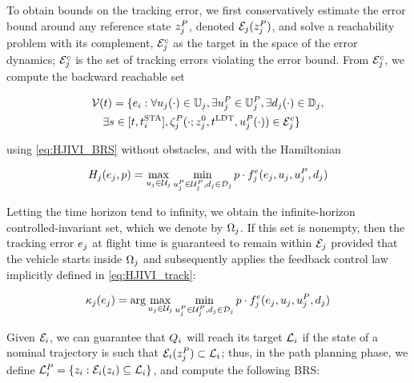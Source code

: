 To obtain bounds on the tracking error, we first conservatively estimate the error bound around any reference state $z_j^P$, denoted $\mathcal{E}_j(z_j^P)$, and solve a reachability problem with its complement, $\mathcal{E}_j^c$ as the target in the space of the error dynamics; $\mathcal{E}_j^c$ is the set of tracking errors violating the error bound. From $\mathcal{E}_j^c$, we compute the backward reachable set 

\begin{equation}
\label{eq:BRS_rtt}
\begin{aligned}
&\brs(t) = \{\errstate_i: \forall \ctrl_j(\cdot) \in \cfset_j, \exists \ctrl_j^P \in \cfset_j^P, \exists \dstb_j(\cdot) \in \dfset_j, \\
&\quad\exists s \in [t, \sta_i], \traj_j^P(\cdot; \state^0_j, \ldt, \ctrl_j^P(\cdot)) \in \errorbound_j^c\}
\end{aligned}
\end{equation}

\noindent using \eqref{eq:HJIVI_BRS} without obstacles, and with the Hamiltonian

\begin{equation}
\label{eq:HJIVI_track}
\ham_j(\errstate_j, \costate) = \max_{\ctrl_j \in \cset_j} \min_{\ctrl_j^P \in\cset^P_j, \dstb_j \in \dset_j} \costate \cdot \fdyn^\errstate_j(\errstate_j, \ctrl_j, \ctrl_j^P, \dstb_j)
\end{equation}

Letting the time horizon tend to infinity, we obtain the infinite-horizon controlled-invariant set, which we denote by $\Omega_j$. If this set is nonempty, then the tracking error $e_j$ at flight time is guaranteed to remain within $\mathcal{E}_j$ provided that the vehicle starts inside $\Omega_j$ and subsequently applies the feedback control law implicitly defined in \eqref{eq:HJIVI_track}:

\begin{equation}
\label{eq:robust_tracking_law}
\tracklaw_j(\errstate_j) = \arg\max_{\ctrl_j \in \cset_j} \min_{\ctrl_j^P \in\cset^P_j, \dstb_j \in \dset_j} \costate \cdot \fdyn^\errstate_j(\errstate_j, \ctrl_j, \ctrl_j^P, \dstb_j)
\end{equation}

Given $\mathcal{E}_i$, we can guarantee that $Q_{i}$ will reach its target $\mathcal{L}_i$ if the state of a nominal trajectory is such that $\mathcal{E}_i(z_j^P) \subset \mathcal{L}_i$; thus, in the path planning phase, we define $\mathcal{L}_i^P = \{z_i: \mathcal{E}_i(z_i) \subseteq \mathcal{L}_i\}$, and compute the following BRS: 

